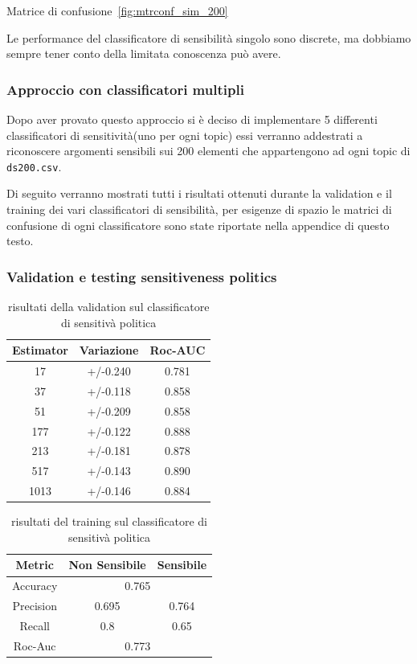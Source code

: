 Matrice di confusione~\ref{fig:mtrconf_sim_200}\newline

Le performance del classificatore di sensibilità singolo sono discrete, ma dobbiamo sempre tener conto della limitata conoscenza può avere.

\subsubsection{Approccio con classificatori multipli}
\label{sssec:multiclass}
Dopo aver provato questo approccio si è deciso di implementare 5 differenti classificatori di sensitività(uno per ogni topic) essi verranno addestrati a riconoscere argomenti sensibili sui 200 elementi che appartengono ad ogni topic di {\tt ds200.csv}.

Di seguito verranno mostrati tutti i risultati ottenuti durante la validation e il training dei vari classificatori di sensibilità, per esigenze di spazio le matrici di confusione di ogni classificatore sono state riportate nella appendice di questo testo.

\subsubsection{Validation e testing sensitiveness politics}
\label{sssec:val_testing_pol}

\begin{table}[h]
\label{tbl:val_sens_pol}
\centering
\begin{tabular}{|c|c|c|}
\hline
\textbf{Estimator} & \textbf{Variazione} & \textbf{Roc-AUC} \\ \hline
17 & +/-0.240 & 0.781 \\ \hline
37 & +/-0.118 & 0.858 \\ \hline
51 & +/-0.209 & 0.858 \\ \hline
177 & +/-0.122 & 0.888 \\ \hline
213 & +/-0.181 & 0.878 \\ \hline
517 & +/-0.143 & 0.890 \\ \hline
1013 & +/-0.146 & 0.884 \\ \hline
\end{tabular}
\caption{risultati della validation sul classificatore di sensitivà politica}
\end{table}
\FloatBarrier

\begin{table}[h]
\label{tbl:training_sens_pol}
\centering
\begin{tabular}{|c|c|c|}
\hline
\textbf{Metric} & \textbf{Non Sensibile} & \textbf{Sensibile} \\ \hline
Accuracy & \multicolumn{2}{c|}{0.765} \\ \hline
Precision & 0.695 & 0.764 \\ \hline
Recall & 0.8 & 0.65 \\ \hline
Roc-Auc & \multicolumn{2}{c|}{0.773} \\ \hline
\end{tabular}
\caption{risultati del training sul classificatore di sensitivà politica}
\end{table}
\FloatBarrier

